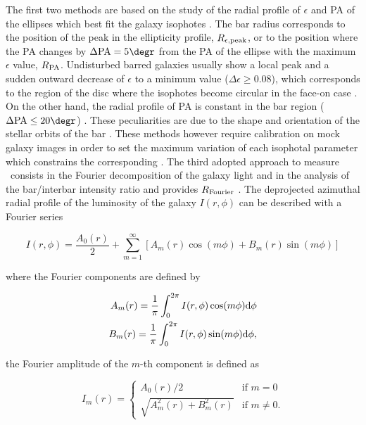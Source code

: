 \documentclass{aa}
\begin{document}
The first two methods are based on the study of the radial profile of $\epsilon$ and PA of the ellipses which best fit the galaxy isophotes \citep{MenendezDelmestre2007,Aguerri2009}. The bar radius corresponds to the position of the peak in the ellipticity profile, $R_{\rm \epsilon,peak}$, or to the position where the PA changes by $\Delta{\rm PA}=5\degr$ from the PA of the ellipse with the maximum $\epsilon$ value, $R_{\rm PA}$. Undisturbed barred galaxies usually show a local peak and a sudden outward decrease of $\epsilon$ to a minimum value ($\Delta \epsilon \geq 0.08$), which corresponds to the region of the disc where the isophotes become circular in the face-on case \citep{Wozniak1991,Athanassoula1992,Aguerri2000}. On the other hand, the radial profile of PA is constant in the bar region ($\Delta {\rm PA} \leq20 \degr$) \citep{Wozniak1991,Aguerri2000}. These peculiarities are due to the shape and orientation of the stellar orbits of the bar \citep{Contopoulos1989,Athanassoula1992}. These methods however require calibration on mock galaxy images in order to set the maximum variation of each isophotal parameter which constrains the corresponding \rbar. 
The third adopted approach to measure \rbar\ consists in the Fourier decomposition of the galaxy light and in the analysis of the bar/interbar intensity ratio and provides $R_{\rm Fourier}$ \citep{Ohta1990,Aguerri2000}. The deprojected azimuthal radial profile of the luminosity of the galaxy $I(r,\phi)$ can be described with a Fourier series

\begin{equation}
    I(r,\phi)=\frac{A_0(r)}{2}+\sum_{m=1}^{\infty}[A_m(r)\cos({m\phi})+B_m(r)\sin({m\phi})]
\end{equation}

\noindent where the Fourier components are defined by

\begin{eqnarray}
A_m(r)=\frac{1}{\pi}\int_0^{2\pi} I(r,\phi)\cos({m\phi}) {\rm d}\phi \\ B_m(r)=\frac{1}{\pi}\int_0^{2\pi} I(r,\phi)\sin({m\phi}) {\rm d}\phi,
\end{eqnarray}

\noindent the Fourier amplitude of the $m$-th component is defined as

\begin{equation}
I_m(r)=\begin{cases} 
A_0(r)/2  & \mbox{if }m = 0 \\ \sqrt{A_m^2(r)+B_m^2(r)} & \mbox{if }m \neq 0.
\end{cases}
\end{equation}
\end{document}
